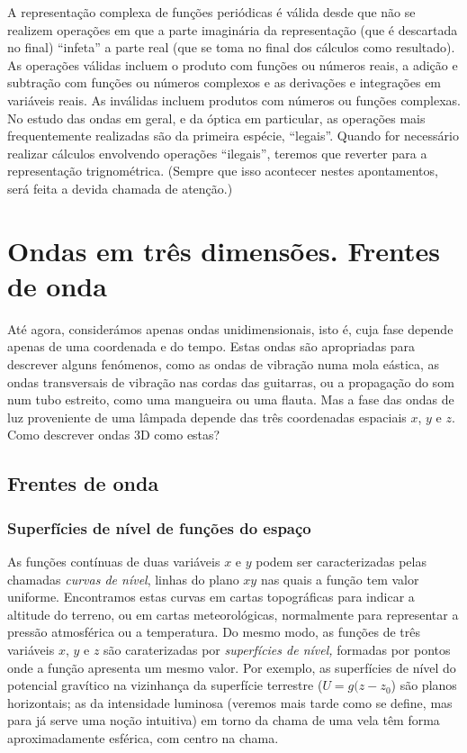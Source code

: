 A representação complexa de funções periódicas é válida desde que não se
realizem operações em que a parte imaginária da representação (que é descartada
no final) ``infeta'' a parte real (que se toma no final dos cálculos como
resultado). As operações válidas incluem o produto com funções ou números reais, a adição e
subtração com funções ou números complexos e as derivações e integrações em
variáveis reais. As inválidas incluem produtos com números ou funções complexas.
No estudo das ondas em geral, e da óptica em particular, as operações mais
frequentemente realizadas são da primeira espécie, ``legais''. Quando for
necessário realizar cálculos envolvendo operações ``ilegais'', teremos que
reverter para a representação trignométrica. (Sempre que isso acontecer nestes
apontamentos, será feita a devida chamada de atenção.)

\section{Ondas em três dimensões. Frentes de onda}
Até agora, considerámos apenas ondas unidimensionais, isto é, cuja fase depende
apenas de uma coordenada e do tempo. Estas ondas são apropriadas para descrever
alguns fenómenos, como as ondas de vibração numa mola eástica, as ondas
transversais de vibração nas cordas das guitarras, ou a propagação do som num
tubo estreito, como uma mangueira ou uma flauta. Mas a fase das ondas de luz
proveniente de uma lâmpada depende das três coordenadas espaciais $x$, $y$ e
$z$. Como descrever ondas 3D como estas?



\subsection{Frentes de onda}
\subsubsection*{Superfícies de nível de funções do espaço}
As funções contínuas de duas variáveis $x$ e $y$ podem ser caracterizadas pelas
chamadas \emph{curvas de nível}, linhas do plano $xy$ nas quais a função tem
valor uniforme. Encontramos estas curvas em cartas topográficas para indicar a
altitude do terreno, ou em cartas meteorológicas, normalmente para representar a
pressão atmosférica ou a temperatura. Do mesmo modo, as funções de três
variáveis $x$, $y$ e $z$ são caraterizadas por \emph{superfícies de nível,}
formadas por pontos onde a função apresenta um mesmo valor. Por exemplo, as
superfícies de nível do potencial gravítico na vizinhança da superfície
terrestre ($U=g(z-z_0$) são planos horizontais; as da intensidade luminosa
(veremos mais tarde como se define, mas para já serve uma noção intuitiva) em
torno da chama de uma vela têm forma aproximadamente esférica, com centro na
chama.

